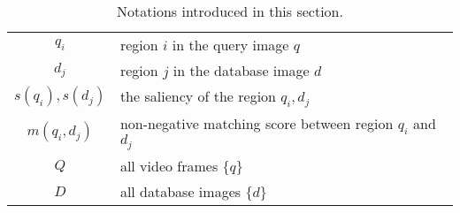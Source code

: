 \begin{table}[htbp]
\begin{center}
\begin{tabular}{|c|p{}|}
\hline
$q_i$ & region $i$ in the query image $q$\\[0.2cm]
$d_j$ & region $j$ in the database image $d$\\[0.2cm]
$s(q_i), s(d_j)$ & the saliency of the region $q_i, d_j$ \\[0.2cm]
$m(q_i, d_j)$ & non-negative matching score between region $q_i$ and $d_j$ \\[0.2cm]
$Q$ & all video frames $\{q\}$ \\[0.2cm]
$D$ & all database images $\{d\}$ \\[0.2cm]
\hline
\end{tabular}
\end{center}
\caption{Notations introduced in this section.}
\label{table:notations}
\end{table}
